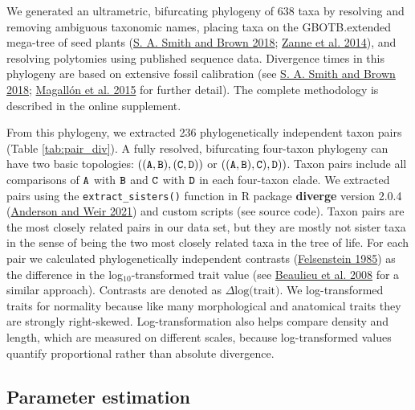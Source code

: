 \documentclass[
  12pt,
]{article}
\begin{document}
We generated an ultrametric, bifurcating phylogeny of 638 taxa by resolving and removing ambiguous taxonomic names, placing taxa on the GBOTB.extended mega-tree of seed plants (\protect\hyperlink{ref-smith_constructing_2018}{S. A. Smith and Brown 2018}; \protect\hyperlink{ref-zanne_three_2014}{Zanne et al. 2014}), and resolving polytomies using published sequence data. Divergence times in this phylogeny are based on extensive fossil calibration (see \protect\hyperlink{ref-smith_constructing_2018}{S. A. Smith and Brown 2018}; \protect\hyperlink{ref-magallon_metacalibrated_2015}{Magallón et al. 2015} for further detail). The complete methodology is described in the online supplement.

From this phylogeny, we extracted 236 phylogenetically independent taxon pairs (Table \ref{tab:pair_div}). A fully resolved, bifurcating four-taxon phylogeny can have two basic topologies: \(\tt{((A,B),(C,D))}\) or \(\tt{((A,B),C),D))}\). Taxon pairs include all comparisons of \(\tt{A}\) with \(\tt{B}\) and \(\tt{C}\) with \(\tt{D}\) in each four-taxon clade. We extracted pairs using the \texttt{extract\_sisters()} function in R package \textbf{diverge} version 2.0.4 (\protect\hyperlink{ref-anderson_diverge_2021}{Anderson and Weir 2021}) and custom scripts (see source code). Taxon pairs are the most closely related pairs in our data set, but they are mostly not sister taxa in the sense of being the two most closely related taxa in the tree of life. For each pair we calculated phylogenetically independent contrasts (\protect\hyperlink{ref-felsenstein_phylogenies_1985}{Felsenstein 1985}) as the difference in the log\(_{10}\)-transformed trait value (see \protect\hyperlink{ref-beaulieu_genome_2008}{Beaulieu et al. 2008} for a similar approach). Contrasts are denoted as \(\Delta \text{log(trait)}\). We log-transformed traits for normality because like many morphological and anatomical traits they are strongly right-skewed. Log-transformation also helps compare density and length, which are measured on different scales, because log-transformed values quantify proportional rather than absolute divergence.

\hypertarget{parameter-estimation}{%
\subsection{Parameter estimation}\label{parameter-estimation}}
\end{document}
